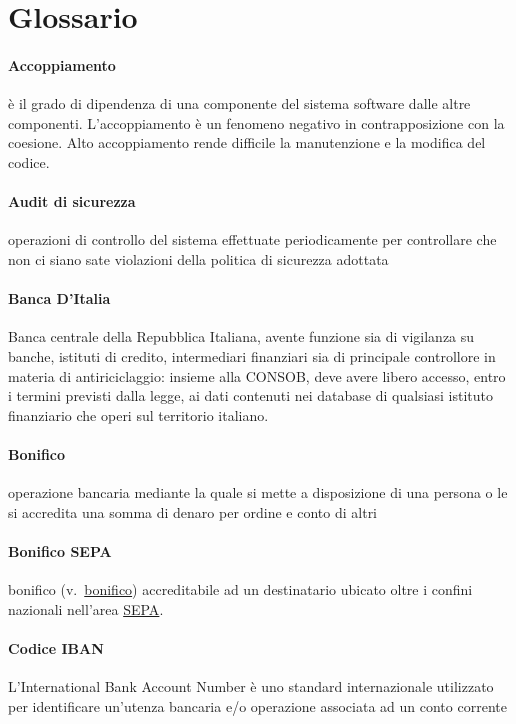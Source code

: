 \section{Glossario}

\paragraph{Accoppiamento}
\`e il grado di dipendenza di una componente del sistema software dalle altre componenti.
L'accoppiamento \`e un fenomeno negativo in contrapposizione con la coesione.
Alto accoppiamento rende difficile la manutenzione e la modifica del codice.

\paragraph{Audit di sicurezza} 
	operazioni di controllo del sistema effettuate periodicamente per controllare che non ci siano sate violazioni della politica di sicurezza adottata
\paragraph{Banca D'Italia}
	 Banca centrale della Repubblica Italiana, avente funzione sia di vigilanza su banche, istituti di credito, intermediari finanziari sia di principale controllore in materia di antiriciclaggio: insieme alla CONSOB, deve avere libero accesso, entro i termini previsti dalla legge, ai dati contenuti nei database di qualsiasi istituto finanziario che operi sul territorio italiano. \cite{banca_italia}
\paragraph{Bonifico} \label{glossario:bonifico}
	operazione bancaria mediante la quale si mette a disposizione di una persona o le si accredita una somma di denaro per ordine e conto di altri
\paragraph{Bonifico SEPA} \label{glossario:bonifico-sepa}
	bonifico (v.~\hyperref[glossario:bonifico]{bonifico}) accreditabile ad un destinatario ubicato oltre i confini nazionali nell'area \hyperref[glossario:sepa]{SEPA}.
\paragraph{Codice IBAN}
	L'International Bank Account Number è uno standard internazionale utilizzato per identificare un'utenza bancaria e/o operazione associata ad un conto corrente 

